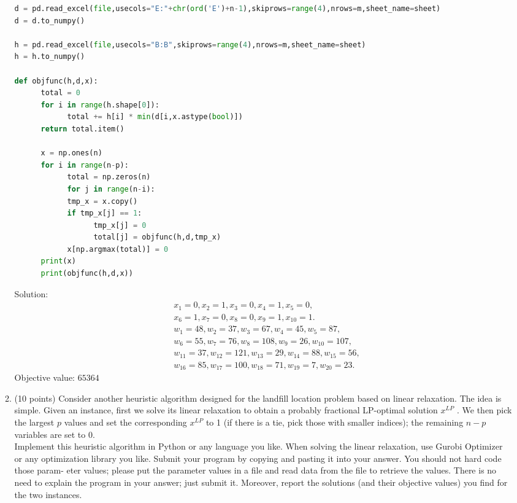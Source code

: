 \documentclass[12pt]{article}
\begin{document}
\begin{enumerate}
\begin{enumerate}
\begin{lstlisting}[language=Python]
d = pd.read_excel(file,usecols="E:"+chr(ord('E')+n-1),skiprows=range(4),nrows=m,sheet_name=sheet)
d = d.to_numpy()

h = pd.read_excel(file,usecols="B:B",skiprows=range(4),nrows=m,sheet_name=sheet)
h = h.to_numpy()

def objfunc(h,d,x):
      total = 0
      for i in range(h.shape[0]):
            total += h[i] * min(d[i,x.astype(bool)])
      return total.item()

      x = np.ones(n)
      for i in range(n-p):
            total = np.zeros(n)
            for j in range(n-i):
            tmp_x = x.copy()
            if tmp_x[j] == 1:
                  tmp_x[j] = 0
                  total[j] = objfunc(h,d,tmp_x)
            x[np.argmax(total)] = 0
      print(x)
      print(objfunc(h,d,x))    
                  \end{lstlisting}
                        Solution:
                        \begin{align*}
                               & x_1 = 0, x_2 = 1, x_3 = 0, x_4 = 1, x_5 = 0,                      \\
                               & x_6 = 1, x_7 = 0, x_8 = 0, x_9 = 1, x_{10} = 1.                   \\
                               & w_1 = 48, w_2 = 37, w_3 = 67, w_4 = 45, w_5 = 87,                 \\
                               & w_6 = 55, w_7 = 76, w_8 = 108, w_9 = 26, w_{10} = 107,            \\
                               & w_{11} = 37, w_{12} = 121, w_{13} = 29, w_{14} = 88, w_{15} = 56, \\
                               & w_{16} = 85, w_{17} = 100, w_{18} = 71, w_{19} = 7, w_{20} = 23.
                        \end{align*}
                        Objective value:  $65364$
                  \item (10 points) Consider another heuristic algorithm designed for the landfill location problem
                        based on linear relaxation. The idea is simple. Given an instance, first we solve its linear
                        relaxation to obtain a probably fractional LP-optimal solution $x^{LP}$ . We then pick the largest
                        $p$ values and set the corresponding $x^{LP}$ to 1 (if there is a tie, pick those with smaller indices);
                        the remaining $n - p$ variables are set to 0.\\
                        Implement this heuristic algorithm in Python or any language you like. When solving the linear relaxation, use Gurobi Optimizer or any optimization library you like. Submit your program by copying and pasting it into your answer. You should not hard code those param- eter values; please put the parameter values in a file and read data from the file to retrieve the values. There is no need to explain the program in your answer; just submit it. Moreover, report the solutions (and their objective values) you find for the two instances.\\

\end{enumerate}
\end{enumerate}
\end{document}
